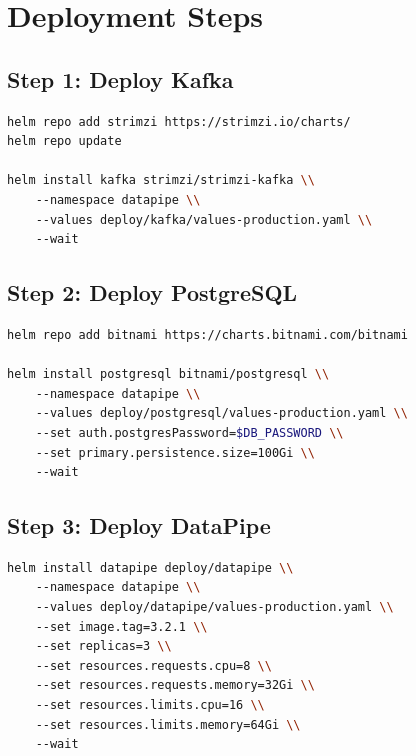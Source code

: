 \documentclass[
    language=english,
    doctype=manual,
    institution=none,
    titlestyle=book,
    oneside,
]{../../omnilatex}
\begin{document}
\chapter{Deployment Steps}
\label{sec:deployment}

\section{Step 1: Deploy Kafka}

\begin{lstlisting}[language=bash, caption={Deploy Kafka using Strimzi operator.}]
helm repo add strimzi https://strimzi.io/charts/
helm repo update

helm install kafka strimzi/strimzi-kafka \\
    --namespace datapipe \\
    --values deploy/kafka/values-production.yaml \\
    --wait
\end{lstlisting}

\section{Step 2: Deploy PostgreSQL}

\begin{lstlisting}[language=bash, caption={Deploy PostgreSQL with Helm.}]
helm repo add bitnami https://charts.bitnami.com/bitnami

helm install postgresql bitnami/postgresql \\
    --namespace datapipe \\
    --values deploy/postgresql/values-production.yaml \\
    --set auth.postgresPassword=$DB_PASSWORD \\
    --set primary.persistence.size=100Gi \\
    --wait
\end{lstlisting}

\section{Step 3: Deploy DataPipe}

\begin{lstlisting}[language=bash, caption={Deploy DataPipe application.}]
helm install datapipe deploy/datapipe \\
    --namespace datapipe \\
    --values deploy/datapipe/values-production.yaml \\
    --set image.tag=3.2.1 \\
    --set replicas=3 \\
    --set resources.requests.cpu=8 \\
    --set resources.requests.memory=32Gi \\
    --set resources.limits.cpu=16 \\
    --set resources.limits.memory=64Gi \\
    --wait
\end{lstlisting}
\end{document}
